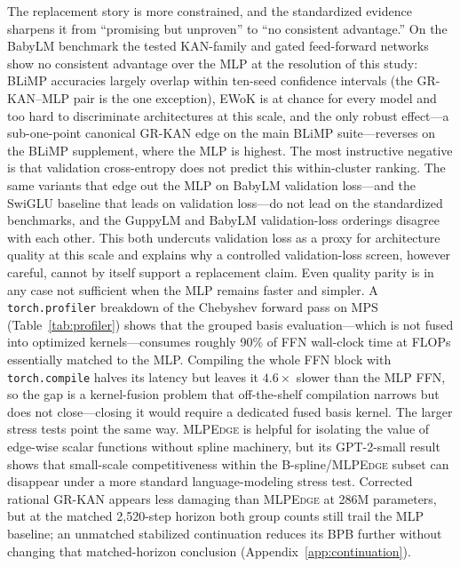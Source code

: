 \documentclass{article}
\newcommand{\modelname}[1]{\textsc{#1}}
\newcommand{\grkan}{\modelname{GR-KAN}}
\newcommand{\mlpedge}{\modelname{MLPEdge}}
\begin{document}
The replacement story is more constrained, and the standardized evidence sharpens it from ``promising but unproven'' to ``no consistent advantage.'' On the BabyLM benchmark the tested KAN-family and gated feed-forward networks show no consistent advantage over the MLP at the resolution of this study: BLiMP accuracies largely overlap within ten-seed confidence intervals (the \grkan{}--MLP pair is the one exception), EWoK is at chance for every model and too hard to discriminate architectures at this scale, and the only robust effect---a sub-one-point canonical \grkan{} edge on the main BLiMP suite---reverses on the BLiMP supplement, where the MLP is highest. The most instructive negative is that validation cross-entropy does not predict this within-cluster ranking. The same variants that edge out the MLP on BabyLM validation loss---and the SwiGLU baseline that leads on validation loss---do not lead on the standardized benchmarks, and the GuppyLM and BabyLM validation-loss orderings disagree with each other. This both undercuts validation loss as a proxy for architecture quality at this scale and explains why a controlled validation-loss screen, however careful, cannot by itself support a replacement claim. Even quality parity is in any case not sufficient when the MLP remains faster and simpler. A \texttt{torch.profiler} breakdown of the Chebyshev forward pass on MPS (Table~\ref{tab:profiler}) shows that the grouped basis evaluation---which is not fused into optimized kernels---consumes roughly 90\% of FFN wall-clock time at FLOPs essentially matched to the MLP. Compiling the whole FFN block with \texttt{torch.compile} halves its latency but leaves it \(4.6\times\) slower than the MLP FFN, so the gap is a kernel-fusion problem that off-the-shelf compilation narrows but does not close---closing it would require a dedicated fused basis kernel. The larger stress tests point the same way. \mlpedge{} is helpful for isolating the value of edge-wise scalar functions without spline machinery, but its GPT-2-small result shows that small-scale competitiveness within the B-spline/\mlpedge{} subset can disappear under a more standard language-modeling stress test. Corrected rational \grkan{} appears less damaging than \mlpedge{} at 286M parameters, but at the matched 2,520-step horizon both group counts still trail the MLP baseline; an unmatched stabilized continuation reduces its BPB further without changing that matched-horizon conclusion (Appendix~\ref{app:continuation}).
\end{document}
